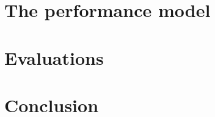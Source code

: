 \documentclass[preprint, 12pt]{elsarticle}
\begin{document}
\section{The performance model}
\label{sec:perf_model}


\section{Evaluations}
\label{sec:evaluations}


\section{Conclusion}
\label{sec:conc}






%  

\end{document}
